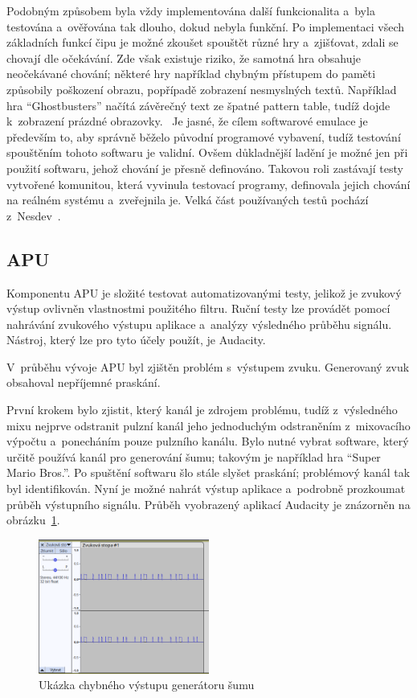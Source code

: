 Podobným způsobem byla vždy implementována další funkcionalita a~byla testována a~ověřována tak dlouho, dokud nebyla funkční. Po implementaci všech základních funkcí čipu je možné zkoušet spouštět různé hry a~zjišťovat, zdali se chovají dle očekávání. Zde však existuje riziko, že samotná hra obsahuje neočekávané chování; některé hry například chybným přístupem do paměti způsobily poškození obrazu, popřípadě zobrazení nesmyslných textů. Například hra \enquote{Ghostbusters} načítá závěrečný text ze špatné pattern table, tudíž dojde k~zobrazení prázdné obrazovky.~\cite{Nesdev:game-bugs} Je jasné, že cílem softwarové emulace je především to, aby správně běželo původní programové vybavení, tudíž testování spouštěním tohoto softwaru je validní. Ovšem důkladnější ladění je možné jen při použití softwaru, jehož chování je přesně definováno. Takovou roli zastávají testy vytvořené komunitou, která vyvinula testovací programy, definovala jejich chování na reálném systému a~zveřejnila je. Velká část používaných testů pochází z~Nesdev~\cite{Nesdev:tests}.

\subsection{APU}
Komponentu APU je složité testovat automatizovanými testy, jelikož je zvukový výstup ovlivněn vlastnostmi použitého filtru. Ruční testy lze provádět pomocí nahrávání zvukového výstupu aplikace a~analýzy výsledného průběhu signálu. Nástroj, který lze pro tyto účely použít, je Audacity.

V~průběhu vývoje APU byl zjištěn problém s~výstupem zvuku. Generovaný zvuk obsahoval nepříjemné praskání.

První krokem bylo zjistit, který kanál je zdrojem problému, tudíž z~výsledného mixu nejprve odstranit pulzní kanál jeho jednoduchým odstraněním z~mixovacího výpočtu a~ponecháním pouze pulzního kanálu. Bylo nutné vybrat software, který určitě používá kanál pro generování šumu; takovým je například hra \enquote{Super Mario Bros.}. Po spuštění softwaru šlo stále slyšet praskání; problémový kanál tak byl identifikován. Nyní je možné nahrát výstup aplikace a~podrobně prozkoumat průběh výstupního signálu. Průběh vyobrazený aplikací Audacity je znázorněn na obrázku~\ref{fig:test-sum-chybne}.

\begin{figure}[ht!]
	\centering
	\caption{Ukázka chybného výstupu generátoru šumu}
	\label{fig:test-sum-chybne}
	\includegraphics[width=0.5\textwidth]{images/audacity_chybne.png}
\end{figure}

